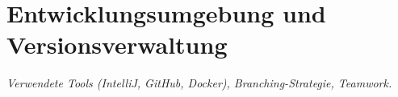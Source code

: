 \section{Entwicklungsumgebung und Versionsverwaltung}
\textit{Verwendete Tools (IntelliJ, GitHub, Docker), Branching-Strategie, Teamwork.}